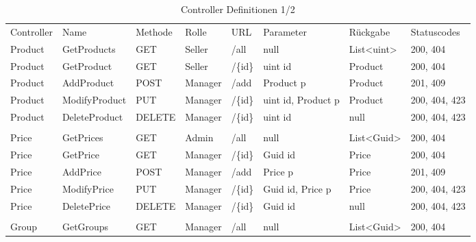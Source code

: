 \begin{table}
	\caption{Controller Definitionen 1/2}
	\centering
	\label{controller1}
\begin{tabular}{llllllll}
	Controller   & Name          & Methode & Rolle     & URL       & Parameter          & Rückgabe                          & Statuscodes   \\
	Product      & GetProducts   & GET     & Seller    & /all      & null               & List\textless{}uint\textgreater{} & 200, 404      \\
	Product      & GetProduct    & GET     & Seller    & /\{id\}   & uint id            & Product                           & 200, 404      \\
	Product      & AddProduct    & POST    & Manager   & /add      & Product p          & Product                           & 201, 409      \\
	Product      & ModifyProduct & PUT     & Manager   & /\{id\}   & uint id, Product p & Product                           & 200, 404, 423 \\
	Product      & DeleteProduct & DELETE  & Manager   & /\{id\}   & uint id            & null                              & 200, 404, 423 \\
	&               &         &           &           &                    &                                   &               \\
	Price        & GetPrices     & GET     & Admin     & /all      & null               & List\textless{}Guid\textgreater{} & 200, 404      \\
	Price        & GetPrice      & GET     & Manager   & /\{id\}   & Guid id            & Price                             & 200, 404      \\
	Price        & AddPrice      & POST    & Manager   & /add      & Price p            & Price                             & 201, 409      \\
	Price        & ModifyPrice   & PUT     & Manager   & /\{id\}   & Guid id, Price p   & Price                             & 200, 404, 423 \\
	Price        & DeletePrice   & DELETE  & Manager   & /\{id\}   & Guid id            & null                              & 200, 404, 423 \\
	&               &         &           &           &                    &                                   &               \\
	Group        & GetGroups     & GET     & Manager   & /all      & null               & List\textless{}Guid\textgreater{} & 200, 404      \\

\end{tabular}
\end{table}
